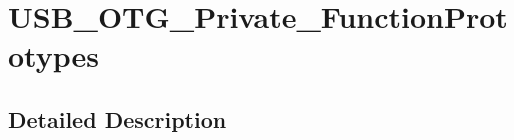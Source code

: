 \hypertarget{group___u_s_b___o_t_g___private___function_prototypes}{\section{U\-S\-B\-\_\-\-O\-T\-G\-\_\-\-Private\-\_\-\-Function\-Prototypes}
\label{group___u_s_b___o_t_g___private___function_prototypes}
}


\subsection{Detailed Description}
